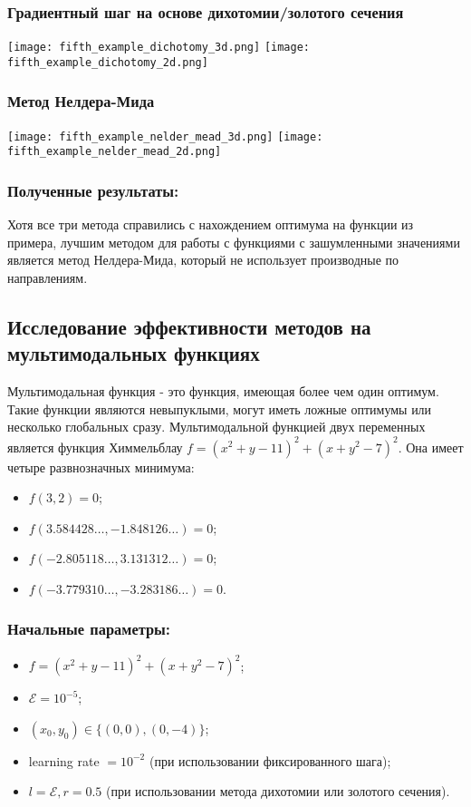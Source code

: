 \documentclass{article}
\begin{document}
\subsubsection*{Градиентный шаг на основе дихотомии/золотого сечения}
\begin{center}
    \texttt{[image: fifth\_example\_dichotomy\_3d.png]}
    \texttt{[image: fifth\_example\_dichotomy\_2d.png]}
    \label{fig:enter-label}
\end{center}
\subsubsection*{Метод Нелдера-Мида}
\begin{center}
    \texttt{[image: fifth\_example\_nelder\_mead\_3d.png]}
    \texttt{[image: fifth\_example\_nelder\_mead\_2d.png]}
    \label{fig:enter-label}
\end{center}
\subsubsection*{Полученные результаты:}
Хотя все три метода справились с нахождением оптимума на функции из примера, лучшим методом для работы с функциями с зашумленными значениями является метод Нелдера-Мида, который не использует производные по направлениям. 
\subsection*{Исследование эффективности методов на мультимодальных функциях}
Мультимодальная функция - это функция, имеющая более чем один оптимум. Такие функции являются невыпуклыми, могут иметь ложные оптимумы или несколько глобальных сразу. Мультимодальной функцией двух переменных является функция Химмельблау $f = (x^2 + y - 11)^2 + (x + y^2 - 7)^2$. Она имеет четыре развнозначных минимума:
\begin{itemize}
    \item $f(3, 2) = 0$;
    \item $f(3.584428\dots, -1.848126\dots) = 0$;
    \item $f(-2.805118\dots, 3.131312\dots) = 0$;
    \item $f(-3.779310\dots, -3.283186\dots) = 0$.
\end{itemize}
\subsubsection*{Начальные параметры:}
\begin{itemize}
    \item $f = (x^2 + y - 11)^2 + (x + y^2 - 7)^2$;
    \item $\mathcal{E} = 10^{-5}$;
    \item $(x_0, y_0) \in \{(0, 0), (0, -4)\}$;
    \item learning rate $= 10^{-2}$ (при использовании фиксированного шага);
    \item $l = \mathcal{E}, r = 0.5$ (при использовании метода дихотомии или золотого сечения).
\end{itemize}
\end{document}
